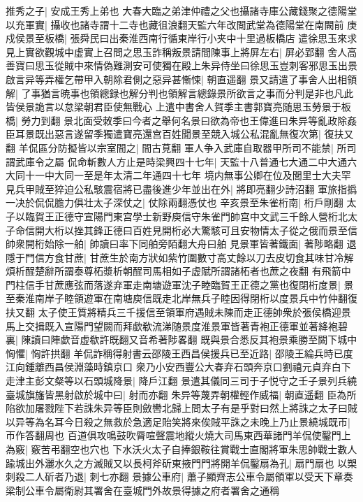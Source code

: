 推秀之子|{
	安成王秀上弟也}
大春大臨之弟津仲禮之父也攝諸寺庫公藏錢聚之德陽堂以充軍實|{
	攝收也諸寺謂十二寺也藏徂浪翻天監六年改閲武堂為德陽堂在南闕前}
庚戍侯景至板橋|{
	張舜民曰出秦淮西南行循東岸行小夹中十里過板橋店}
遣徐思玉來求見上實欲觀城中虚實上召問之思玉詐稱叛景請間陳事上將屏左右|{
	屏必郢翻}
舍人高善寶曰思玉從賊中來情偽難測安可使獨在殿上朱异侍坐曰徐思玉豈刺客邪思玉出景啟言异等弄權乞帶甲入朝除君側之惡异甚慚悚|{
	朝直遥翻}
景又請遣了事舍人出相領解|{
	了事猶言暁事也領總録也解分判也領解言總錄景所欲言之事而分判是非也凡此皆侯景詭言以怠梁朝君臣使無戰心}
上遣中書舍人賀季主書郭寶亮随思玉勞景于板橋|{
	勞力到翻}
景北面受敇季曰今者之舉何名景曰欲為帝也王偉進曰朱异等亂政除姦臣耳景既出惡言遂留季獨遣寶亮還宫百姓聞景至競入城公私混亂無復次第|{
	復扶又翻}
羊侃區分防擬皆以宗室間之|{
	間古莧翻}
軍人争入武庫自取器甲所司不能禁|{
	所司謂武庫令之屬}
侃命斬數人方止是時梁興四十七年|{
	天監十八普通七大通二中大通六大同十一中大同一至是年太清二年通四十七年}
境内無事公卿在位及閭里士大夫罕見兵甲賊至猝迫公私駭震宿將已盡後進少年並出在外|{
	將即亮翻少詩沼翻}
軍旅指撝一决於侃侃膽力俱壮太子深仗之|{
	仗除兩翻憑仗也}
辛亥景至朱雀桁南|{
	桁戶剛翻}
太子以臨賀王正德守宣陽門東宫學士新野庾信守朱雀門帥宫中文武三千餘人營桁北太子命信開大桁以挫其鋒正德曰百姓見開桁必大驚駭可且安物情太子從之俄而景至信帥衆開桁始除一舶|{
	帥讀曰率下同舶旁陌翻大舟曰舶}
見景軍皆著鐵面|{
	著陟略翻}
退隱于門信方食甘蔗|{
	甘蔗生於南方狀如紫竹圍數寸高丈餘以刀去皮切食其味甘冷解煩析酲楚辭所謂泰尊柘漿析朝酲司馬相如子虚賦所謂諸柘者也蔗之夜翻}
有飛箭中門柱信手甘蔗應弦而落遂弃軍走南塘遊軍沈子睦臨賀王正德之黨也復閉桁度景|{
	景至秦淮南岸子睦領遊軍在南塘庾信既走北岸無兵子睦因得閉桁以度景兵中竹仲翻復扶又翻}
太子使王質將精兵三千援信至領軍府遇賊未陳而走正德帥衆於張侯橋迎景馬上交揖既入宣陽門望闕而拜歔欷流涕随景度淮景軍皆著青袍正德軍並著絳袍碧裏|{
	陳讀曰陣歔音虚欷許既翻又音希著陟畧翻}
既與景合悉反其袍景乘勝至闕下城中恟懼|{
	恟許拱翻}
羊侃詐稱得射書云邵陵王西昌侯援兵已至近路|{
	邵陵王綸兵時已度江向鍾離西昌侯淵藻時鎮京口}
衆乃小安西豐公大春弃石頭奔京口劉禧元貞弃白下走津主彭文粲等以石頭城降景|{
	降戶江翻}
景遣其儀同三司于子悦守之壬子景列兵繞臺城旗旛皆黑射啟於城中曰|{
	射而亦翻}
朱异等蔑弄朝權輕作威福|{
	朝直遥翻}
臣為所陷欲加屠戮陛下若誅朱异等臣則斂轡北歸上問太子有是乎對曰然上將誅之太子曰賊以异等為名耳今日殺之無救於急適足貽笑將來俟賊平誅之未晚上乃止景繞城既帀|{
	帀作答翻周也}
百道俱攻鳴鼓吹脣喧聲震地縱火燒大司馬東西華諸門羊侃使鑿門上為竅|{
	竅苦弔翻空也穴也}
下水沃火太子自捧銀鞍往賞戰士直閣將軍朱思帥戰士數人踰城出外灑水久之方滅賊又以長柯斧斫東掖門門將開羊侃鑿扇為孔|{
	扇門扇也}
以槊刺殺二人斫者乃退|{
	刺七亦翻}
景據公車府|{
	蕭子顯齊志公車令屬領軍以受天下章奏梁制公車令屬衛尉其署舍在臺城門外故景得據之府者署舍之通稱}
